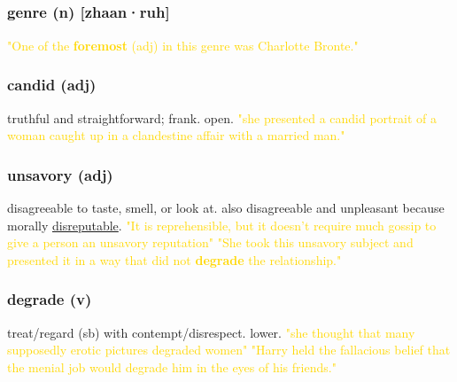 \documentclass{proc}
\begin{document}
	\newpage
	\setcounter{section}{36}
	\setcounter{subsection}{0}
	
	
	\subsection{}
	\subsubsection{\textcolor{brickred}{genre} (n) [zhaan·ruh]}
	
	\textcolor{gold}{"One of the \textbf{foremost} (adj) in this genre was 
		Charlotte Bronte."}
	
	\subsubsection{\textcolor{brickred}{candid} (adj)}
	truthful and straightforward; frank. open.
	\textcolor{gold}{"she presented a candid 
		portrait of a woman caught up in a clandestine affair with 
		a married man."}
	
	\subsubsection{\textcolor{brickred}{unsavory} (adj)}
	disagreeable to taste, smell, or look at. also disagreeable and unpleasant because morally \underline{disreputable}.
	\textcolor{gold}{"It is reprehensible, but it doesn't require much gossip to give a person an unsavory reputation" "She took this unsavory subject and presented it 
		in a way that did not \textbf{degrade} the relationship."}
	
	\subsubsection{\textcolor{brickred}{degrade} (v)}
	treat/regard (sb) with contempt/disrespect. lower.
	\textcolor{gold}{"she thought that many supposedly erotic pictures degraded women" "Harry held the fallacious belief that the menial job would degrade him 
		in the eyes of his friends."}
	
\end{document}

